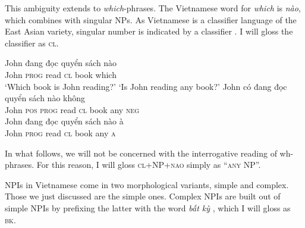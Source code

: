 \documentclass[output=paper,colorlinks,citecolor=brown]{langscibook}
\begin{document}
This ambiguity extends to \textit{which}-phrases. The Vietnamese word for \textit{which} is \textit{nào}, which combines with singular NPs. As Vietnamese is a classifier language of the East Asian variety, singular number is indicated by a classifier \citep{Chierchia1998, trinh2011nominal}. %
I will gloss the classifier as \textsc{cl}.

\ea
\ea
\gll John đang đọc quyển sách nào\\
John \textsc{prog} read \textsc{cl} book which\\
\glt `Which book is John reading?'
\ex\label{npiinq}`Is John reading any book?'
\ea\label{ex:09:neutral}
\glt John có đang đọc quyển sách nào không\\
John \textsc{pos} \textsc{prog} read \textsc{cl} book any \textsc{neg} \\
\ex
\gll John đang đọc quyển sách nào à\\
John \textsc{prog} read \textsc{cl} book any \textsc{a}\\
\z
\z
\z

In what follows, we will not be concerned with the interrogative reading of wh-phrases. For this reason, I will gloss \textsc{cl}+NP+\textsc{nao} simply as ``\textsc{any} NP''. %

NPIs in Vietnamese come in two morphological variants, simple and complex. Those we just discussed are the simple ones. Complex NPIs are built out of simple NPIs by prefixing the latter with the word \textit{bất kỳ} \citep{trinh2020bipartite}, which I will gloss as \textsc{bk}. 
\end{document}
